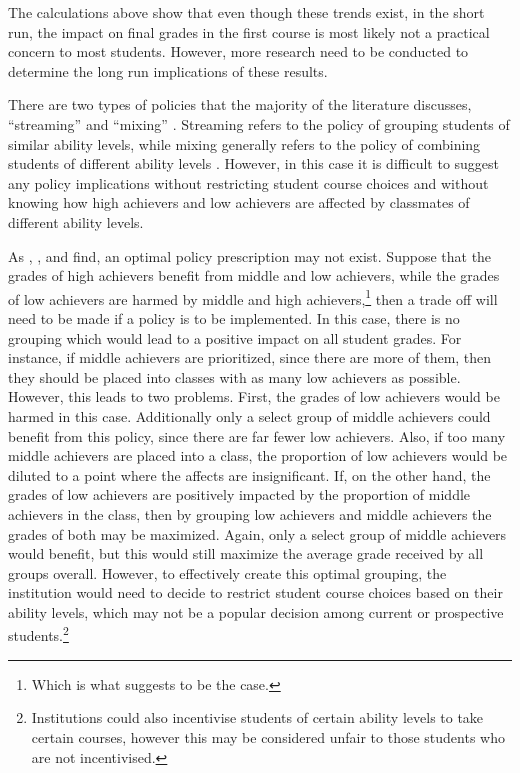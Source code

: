 The calculations above show that even though these trends exist, in the short run, the impact on final grades in the first course is most likely not a practical concern to most students. 
However, more research need to be conducted to determine the long run implications of these results. 

There are two types of policies that the majority of the literature discusses, ``streaming'' and ``mixing'' \citep{ding2007peers,kang2007classroom,carman2012classroom}. 
Streaming refers to the policy of grouping students of similar ability levels, while mixing generally refers to the policy of combining students of different ability levels \citep{ding2007peers}.
However, in this case it is difficult to suggest any policy implications without restricting student course choices and without knowing how high achievers and low achievers are affected by classmates of different ability levels. 

As \citet{burke2013classroom}, \citet{carman2012classroom}, and \citet{ding2007peers} find, an optimal policy prescription may not exist.
Suppose that the grades of high achievers benefit from middle and low achievers, while the grades of low achievers are harmed by middle and high achievers,\footnote{Which is what  suggests to be the case.} then a trade off will need to be made if a policy is to be implemented. 
In this case, there is no grouping which would lead to a positive impact on all student grades. 
For instance, if middle achievers are prioritized, since there are more of them, then they should be placed into classes with as many low achievers as possible. 
However, this leads to two problems.
First, the grades of low achievers would be harmed in this case.
Additionally only a select group of middle achievers could benefit from this policy, since there are far fewer low achievers. 
Also, if too many middle achievers are placed into a class, the proportion of low achievers would be diluted to a point where the affects are insignificant. 
If, on the other hand, the grades of low achievers are positively impacted by the proportion of middle achievers in the class, then by grouping low achievers and middle achievers the grades of both may be maximized.
Again, only a select group of middle achievers would benefit, but this would still maximize the average grade received by all groups overall.
However, to effectively create this optimal grouping, the institution would need to decide to restrict student course choices based on their ability levels, which may not be a popular decision among current or prospective students.\footnote{Institutions could also incentivise students of certain ability levels to take certain courses, however this may be considered unfair to those students who are not incentivised.}

